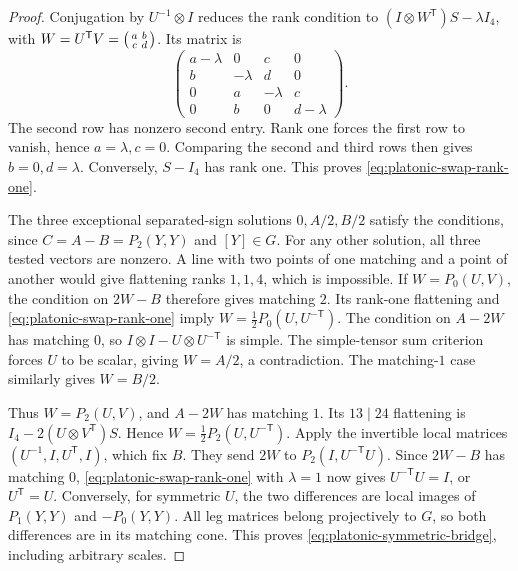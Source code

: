 \documentclass[11pt,letterpaper,onecolumn]{article}
\theoremstyle{plain}
\theoremstyle{definition}
\theoremstyle{remark}
\begin{document}
\begin{proof}
Conjugation by \(U^{-1}\otimes I\) reduces the rank condition to
\((I\otimes W^{\mathsf T})S-\lambda I_4\), with
\(W=U^{\mathsf T}V=\begin{psmallmatrix}a&b\\c&d\end{psmallmatrix}\).
Its matrix is
\[
 \begin{pmatrix}
 a-\lambda&0&c&0\\
 b&-\lambda&d&0\\
 0&a&-\lambda&c\\
 0&b&0&d-\lambda
 \end{pmatrix}.
\]
The second row has nonzero second entry.  Rank one forces the first row
to vanish, hence \(a=\lambda,c=0\). Comparing the second and third rows
then gives \(b=0,d=\lambda\).  Conversely, \(S-I_4\) has rank one.
This proves \cref{eq:platonic-swap-rank-one}.

The three exceptional separated-sign solutions \(0,A/2,B/2\) satisfy the conditions,
since \(C=A-B=P_2(Y,Y)\) and \([Y]\in G\).  For any other solution,
all three tested vectors are nonzero.  A line with two points of one
matching and a point of another would give flattening ranks \(1,1,4\),
which is impossible.  If \(W=P_0(U,V)\), the condition on \(2W-B\)
therefore gives matching \(2\).  Its rank-one flattening and
\cref{eq:platonic-swap-rank-one} imply
\(W=\tfrac12P_0(U,U^{-\mathsf T})\).
The condition on \(A-2W\) has matching \(0\), so
\(I\otimes I-U\otimes U^{-\mathsf T}\) is simple.  The simple-tensor
sum criterion forces \(U\) to be scalar, giving \(W=A/2\), a
contradiction.  The matching-\(1\) case similarly gives \(W=B/2\).

Thus \(W=P_2(U,V)\), and \(A-2W\) has matching \(1\).
Its \(13\mid24\) flattening is
\(I_4-2(U\otimes V^{\mathsf T})S\). Hence
\(W=\tfrac12P_2(U,U^{-\mathsf T})\).
Apply the invertible local matrices \((U^{-1},I,U^{\mathsf T},I)\),
which fix \(B\).  They send \(2W\) to
\(P_2(I,U^{-\mathsf T}U)\).  Since \(2W-B\) has matching \(0\),
\cref{eq:platonic-swap-rank-one} with \(\lambda=1\) now gives
\(U^{-\mathsf T}U=I\), or \(U^{\mathsf T}=U\).
Conversely, for symmetric \(U\), the two differences are local images
of \(P_1(Y,Y)\) and \(-P_0(Y,Y)\).  All leg matrices belong projectively
to \(G\), so both differences are in its matching cone.  This proves
\cref{eq:platonic-symmetric-bridge}, including arbitrary scales.


\end{proof}
\end{document}
